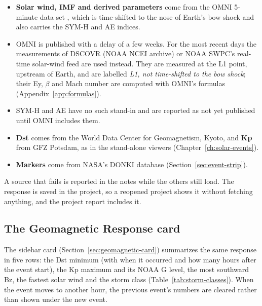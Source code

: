 \begin{itemize}
  \item \textbf{Solar wind, IMF and derived parameters} come from the OMNI 5-minute data set
    \parencite{king2005}, which is time-shifted to the nose of Earth's bow shock and also carries
    the SYM-H \parencite{iyemori1990} and AE \parencite{davis1966} indices.
  \item OMNI is published with a delay of a few weeks. For the most recent days the
    measurements of DSCOVR (NOAA NCEI archive) or NOAA SWPC's real-time solar-wind feed are used
    instead. They are measured at the L1 point, upstream of Earth, and are labelled \emph{L1, not
    time-shifted to the bow shock}; their Ey, \(\beta\) and Mach number are computed with OMNI's
    formulas (Appendix~\ref{app:formulas}).
  \item SYM-H and AE have no such stand-in and are reported as not yet published until OMNI
    includes them.
  \item \textbf{Dst} comes from the World Data Center for Geomagnetism, Kyoto, and
    \textbf{Kp} from GFZ Potsdam, as in the stand-alone viewers (Chapter~\ref{ch:solar-events}).
  \item \textbf{Markers} come from NASA's DONKI database \parencite{donki}
    (Section~\ref{sec:event-strip}).
\end{itemize}
A source that fails is reported in the notes while the others still load. The response is saved
in the project, so a reopened project shows it without fetching anything, and the project report
includes it.

\subsection{The Geomagnetic Response card}
\label{sec:geomagnetic-card-summary}

The sidebar card (Section~\ref{sec:geomagnetic-card}) summarizes the same response in five
rows: the Dst minimum (with when it occurred and how many hours after the event start), the Kp
maximum and its NOAA G level, the most southward Bz, the fastest solar wind and the storm class
(Table~\ref{tab:storm-classes}). When the event moves to another hour, the previous event's
numbers are cleared rather than shown under the new event.


